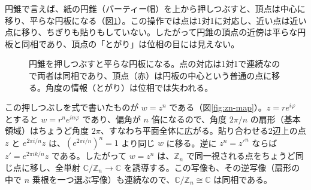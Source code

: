 \documentclass[uplatex, dvipdfmx, book]{jsbook}
\begin{document}
円錐で言えば、紙の円錐（パーティー帽）を上から押しつぶすと、頂点は中心に移り、平らな円板になる（図\ref{fig:cone-flatten}）。この操作では点は1対1に対応し、近い点は近い点に移り、ちぎりも貼りもしていない。したがって円錐の頂点の近傍は平らな円板と同相であり、頂点の「とがり」は位相の目には見えない。

\begin{figure}[htbp]
\centering
{}
\caption{円錐を押しつぶすと平らな円板になる。点の対応は1対1で連続なので両者は同相であり、頂点（赤）は円板の中心という普通の点に移る。角度の情報（とがり）は位相では失われる。}
\label{fig:cone-flatten}
\end{figure}

この押しつぶしを式で書いたものが $w = z^n$ である（図\ref{fig:zn-map}）。$z = re^{i\varphi}$ とすると $w = r^n e^{in\varphi}$ であり、偏角が $n$ 倍になるので、角度 $2\pi/n$ の扇形（基本領域）はちょうど角度 $2\pi$、すなわち平面全体に広がる。貼り合わせる2辺上の点 $z$ と $e^{2\pi i/n}z$ は、$(e^{2\pi i/n})^n = 1$ より同じ $w$ に移る。逆に $z^n = z'^n$ ならば $z' = e^{2\pi i k/n} z$ である。したがって $w = z^n$ は、$\mathbb{Z}_n$ で同一視される点をちょうど同じ点に移し、全単射 $\mathbb{C}/\mathbb{Z}_n \to \mathbb{C}$ を誘導する。この写像も、その逆写像（扇形の中で $n$ 乗根を一つ選ぶ写像）も連続なので、$\mathbb{C}/\mathbb{Z}_n \cong \mathbb{C}$ は同相である。
\end{document}
